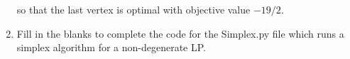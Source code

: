 \documentclass[11pt]{article}
\begin{document}
\begin{enumerate}[1)]
\begin{solution}
so that the last vertex is optimal with objective value $-19/2$. 

\end{solution}



  
 \item Fill in the blanks to complete the code for the Simplex.py file which runs a simplex algorithm for a non-degenerate LP. 




\end{enumerate}



  
\end{document}
